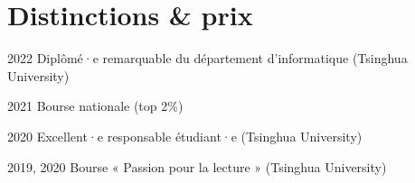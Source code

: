 \section{Distinctions \& prix}
        
        \begin{samepage}
            \begin{twocolentry}[1.5 cm]{
                2022
            }
                Diplômé·e remarquable du département d’informatique (Tsinghua University)
            \end{twocolentry}

            \vspace{0.10 cm}

            \begin{twocolentry}{
                2021
            }
                Bourse nationale (top 2\%)
            \end{twocolentry}


            \vspace{0.10 cm}
            \begin{twocolentry}{
                2020
            }
                Excellent·e responsable étudiant·e (Tsinghua University)
            \end{twocolentry}

            \vspace{0.10 cm}
            \begin{twocolentry}{
                2019, 2020
            }
                Bourse « Passion pour la lecture » (Tsinghua University)
            \end{twocolentry}





\end{samepage}
